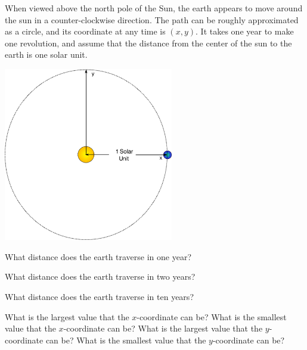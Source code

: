 
\begin{problem}
\item When viewed above the north pole of the Sun, the earth appears
  to move around the sun in a counter-clockwise direction. The path
  can be roughly approximated as a circle, and its coordinate at any
  time is $(x,y)$. It takes one year to make one revolution, and assume
  that the distance from the center of the sun to the earth is one solar unit.

  \begin{center}
    \includegraphics[width=20em]{angles/img/simpleSolarSystem}
  \end{center}

  \begin{subproblem}
  \item What distance does the earth traverse in one year?
    \vfill
  \item What distance does the earth traverse in two years?
    \vfill
  \item What distance does the earth traverse in ten years?
    \vfill
  \item What is the largest value that the $x$-coordinate can be?
    What is the smallest value that the $x$-coordinate can be?
    What is the largest value that the $y$-coordinate can be?
    What is the smallest value that the $y$-coordinate can be?
    \vfill
  \end{subproblem}

\end{problem}


